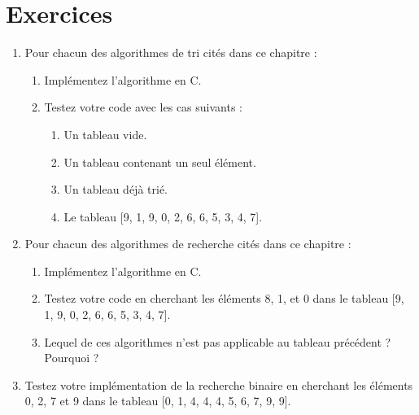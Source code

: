 \section{Exercices}
\begin{enumerate}
	\item Pour chacun des algorithmes de tri cités dans ce chapitre :
	\begin{enumerate}
		\item Implémentez l'algorithme en C.
		\item Testez votre code avec les cas suivants :
		\begin{enumerate}
			\item Un tableau vide.
			\item Un tableau contenant un seul élément.
			\item Un tableau déjà trié.
			\item Le tableau [9, 1, 9, 0, 2, 6, 6, 5, 3, 4, 7].
		\end{enumerate}
	\end{enumerate}
	\item Pour chacun des algorithmes de recherche cités dans ce chapitre :
	\begin{enumerate}
		\item Implémentez l'algorithme en C.
		\item Testez votre code en cherchant les éléments 8, 1, et 0 dans le tableau [9, 1, 9, 0, 2, 6, 6, 5, 3, 4, 7].
		\item Lequel de ces algorithmes n'est pas applicable au tableau précédent ? Pourquoi ?
	\end{enumerate}
	\item Testez votre implémentation de la recherche binaire en cherchant les éléments 0, 2, 7 et 9 dans le tableau [0, 1, 4, 4, 4, 5, 6, 7, 9, 9].
\end{enumerate}


